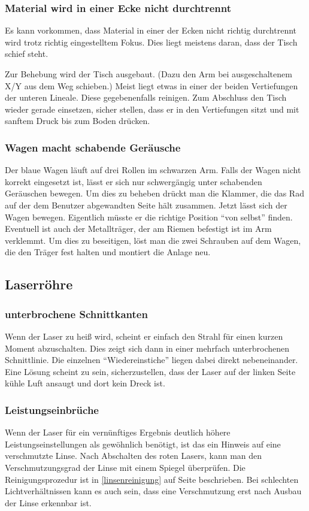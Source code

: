 \documentclass{\basedir/fablab-document}
\begin{document}
	\subsubsection{Material wird in einer Ecke nicht durchtrennt}
	Es kann vorkommen, dass Material in einer der Ecken nicht richtig durchtrennt wird trotz richtig eingestelltem Fokus. Dies liegt meistens daran, dass der Tisch schief steht.

	Zur Behebung wird der Tisch ausgebaut. (Dazu den Arm bei ausgeschaltenem X/Y aus dem Weg schieben.) Meist liegt etwas in einer der beiden Vertiefungen der unteren Lineale. Diese gegebenenfalls reinigen. Zum Abschluss den Tisch wieder gerade einsetzen, sicher stellen, dass er in den Vertiefungen sitzt und mit sanftem Druck bis zum Boden drücken.

	\subsubsection{Wagen macht schabende Geräusche}
	Der blaue Wagen läuft auf drei Rollen im schwarzen Arm. Falls der Wagen nicht korrekt eingesetzt ist, lässt er sich nur schwergängig unter schabenden Geräuschen bewegen. Um dies zu beheben drückt man die Klammer, die das Rad auf der dem Benutzer abgewandten Seite hält zusammen. Jetzt lässt sich der Wagen bewegen. Eigentlich müsste er die richtige Position \enquote{von selbst} finden. Eventuell ist auch der Metallträger, der am Riemen befestigt ist im Arm verklemmt. Um dies zu beseitigen, löst man die zwei Schrauben auf dem Wagen, die den Träger fest halten und montiert die Anlage neu.

	\subsection{Laserröhre}
	\subsubsection{unterbrochene Schnittkanten}
	Wenn der Laser zu heiß wird, scheint er einfach den Strahl für einen kurzen Moment abzuschalten. Dies zeigt sich dann in einer mehrfach unterbrochenen Schnittlinie. Die einzelnen \enquote{Wiedereinstiche} liegen dabei direkt nebeneinander. Eine Lösung scheint zu sein, sicherzustellen, dass der Laser auf der linken Seite kühle Luft ansaugt und dort kein Dreck ist.
	\subsubsection{Leistungseinbrüche}
	Wenn der Laser für ein vernünftiges Ergebnis deutlich höhere Leistungseinstellungen als gewöhnlich benötigt, ist das ein Hinweis auf eine verschmutzte Linse. Nach Abschalten des roten Lasers, kann man den Verschmutzungsgrad der Linse mit einem Spiegel überprüfen. Die Reinigungsprozedur ist in \cref{linsenreinigung} auf Seite \pageref{linsenreinigung} beschrieben. Bei schlechten Lichtverhältnissen kann es auch sein, dass eine Verschmutzung erst nach Ausbau der Linse erkennbar ist.
\end{document}
